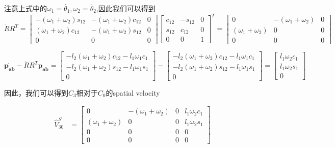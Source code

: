 \documentclass{ctexart}
\begin{document}
注意上式中的$\omega_1 = \dot{\theta_1},\omega_2 = \dot{\theta_2}$,因此我们可以得到
\begin{equation*}
	\dot{R}R^T= \begin{bmatrix}
		-(\omega_1 + \omega_2)s_{12} & -(\omega_1 + \omega_2)c_{12} & 0 \\
		(\omega_1 + \omega_2)c_{12} & -(\omega_1 + \omega_2)s_{12} & 0 \\
		0 & 0 & 0
	\end{bmatrix}\begin{bmatrix}
		c_{12} & -s_{12} & 0 \\
		s_{12} & c_{12} & 0 \\
		0 & 0 & 1
	\end{bmatrix}^T= \begin{bmatrix}
		0 & -(\omega_1+\omega_2) & 0 \\
		(\omega_1+\omega_2)& 0 & 0 \\
		0 & 0 & 0
	\end{bmatrix}
\end{equation*}

\begin{equation*}
	\dot{\boldsymbol{p_{ab}}} - \dot{R}R^T\boldsymbol{p_{ab}} = \begin{bmatrix}
		-l_2(\omega_1 + \omega_2)c_{12} - l_1\omega_1c_1 \\
		-l_2(\omega_1 + \omega_2)s_{12} - l_1\omega_1s_1 \\
		0
	\end{bmatrix}-\begin{bmatrix}
		-l_2(\omega_1 + \omega_2)c_{12} - l_1\omega_1c_1 \\
		-l_2(\omega_1 + \omega_2)s_{12} - l_1\omega_1s_1 \\
		0
	\end{bmatrix} = \begin{bmatrix}
		l_1\omega_2c_1 \\
		l_1\omega_2s_1 \\
		0
	\end{bmatrix}
\end{equation*}

因此，我们可以得到$C_3$相对于$C_0$的spatial velocity

\begin{equation*}
	\begin{aligned}
		\hat{V}^S_{30} &= \begin{bmatrix}
			0 & -(\omega_1+\omega_2) & 0 & l_1\omega_2c_1 \\
			(\omega_1+\omega_2)& 0 & 0 & l_1\omega_2s_1 \\
			0 & 0 & 0 & 0 \\
			0 & 0 & 0 & 0
		\end{bmatrix}
	\end{aligned}
\end{equation*}
\end{document}

